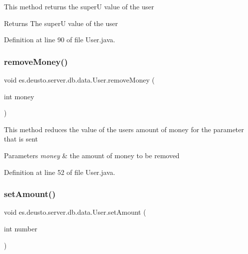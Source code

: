 This method returns the superU value of the user \begin{DoxyReturn}{Returns}
The superU value of the user 
\end{DoxyReturn}


Definition at line 90 of file User.\+java.

\mbox{\label{classes_1_1deusto_1_1server_1_1db_1_1data_1_1_user_a9de251663e6c2ecfdc5dcdac19224a1e}} 
\subsubsection{\texorpdfstring{remove\+Money()}{removeMoney()}}
{\footnotesize\ttfamily void es.\+deusto.\+server.\+db.\+data.\+User.\+remove\+Money (\begin{DoxyParamCaption}\item[{int}]{money }\end{DoxyParamCaption})}

This method reduces the value of the users amount of money for the parameter that is sent 
\begin{DoxyParams}{Parameters}
{\em money} & the amount of money to be removed \\
\hline
\end{DoxyParams}


Definition at line 52 of file User.\+java.

\mbox{\label{classes_1_1deusto_1_1server_1_1db_1_1data_1_1_user_af4381bf3a6dedebc28c50812cb71599a}} 
\subsubsection{\texorpdfstring{set\+Amount()}{setAmount()}}
{\footnotesize\ttfamily void es.\+deusto.\+server.\+db.\+data.\+User.\+set\+Amount (\begin{DoxyParamCaption}\item[{int}]{number }\end{DoxyParamCaption})}

